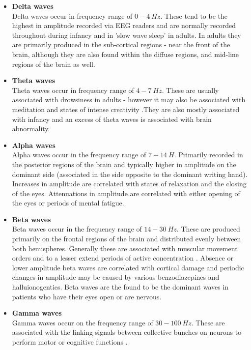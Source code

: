 \documentclass[twocolumn,superscriptaddress]{revtex4-1}
\theoremstyle{definition}
\theoremstyle{remark}
\begin{document}
\begin{itemize}

\item  \textbf{Delta waves} \\
Delta waves occur in frequency range of $0-4 ~ Hz$. These tend to be the highest in amplitude recorded via EEG readers and are normally recorded throughout during infancy and in 'slow wave sleep' in adults. In adults they are primarily produced in the sub-cortical regions - near the front of the brain, although they are also found within the diffuse regions, and mid-line regions of the brain as well.

\item  \textbf{Theta waves} \\
Theta waves occur in frequency range of $4-7 ~ Hz$. These are usually associated with drowsiness in adults - however it may also be associated with meditation and states of intense creativity \cite{meditation}.They are also mostly associated with infancy and an excess of theta waves is associated with brain abnormality. \\

\item  \textbf{Alpha waves} \\
Alpha waves occur in the frequency range of $7-14 ~ H$. Primarily recorded in the posterior regions of the brain and typically higher in amplitude on the dominant side (associated in the side opposite to the dominant writing hand). Increases in amplitude are correlated with states of relaxation and the closing of the eyes. Attenuations in amplitude are correlated with either opening of the eyes or periods of mental fatigue.

\item  \textbf{Beta waves} \\
Beta waves occur in the frequency range of $14-30 ~ Hz$. These are produced primarily on the frontal regions of the brain and distributed evenly between both hemispheres. Generally these are associated with muscular movement orders and to a lesser extend periods of active concentration \cite{beta}. Absence or lower amplitude beta waves are correlated with cortical damage and periodic changes in amplitude may be caused by various benzodiazepines and halluionogentics. Beta waves are the found to be the dominant waves in patients who have their eyes open or are nervous. \\

\item  \textbf{Gamma waves} \\
Gamma waves occur on the frequency range of $30-100 ~ Hz$. These are associated with the linking signals between collective bunches on neurons to perform motor or cognitive functions \cite{basics}.

\end{itemize}
\end{document}
